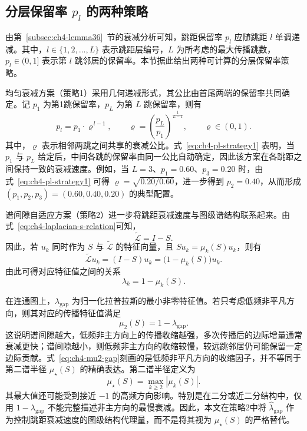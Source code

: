 \subsection{分层保留率 $p_l$ 的两种策略}
\label{subsec:ch4-plstrategy}
\label{idx:innov:hopdist}

由第~\ref{subsec:ch4-lemma36}~节的衰减分析可知，跳距保留率 \(p_l\) 应随跳距 \(l\) 单调递减。其中，\(l\in\{1,2,\dots,L\}\) 表示跳距层编号，\(L\) 为所考虑的最大传播跳数，\(p_l\in(0,1]\) 表示第 \(l\) 跳邻居的保留率。本节据此给出两种可计算的分层保留率策略。

均匀衰减方案（策略1）采用几何递减形式，其公比由首尾两端的保留率共同确定。记 \(p_1\) 为第1跳保留率，\(p_L\) 为第 \(L\) 跳保留率，则有
\begin{equation}
  p_l = p_1 \cdot \varrho^{\,l-1},
  \qquad
  \varrho=\left(\frac{p_L}{p_1}\right)^{\frac{1}{L-1}},
  \qquad \varrho\in(0,1).
  \label{eq:ch4-pl-strategy1}
\end{equation}
其中，\(\varrho\) 表示相邻两跳之间共享的衰减公比。式~\eqref{eq:ch4-pl-strategy1} 表明，当 \(p_1\) 与 \(p_L\) 给定后，中间各跳的保留率由同一公比自动确定，因此该方案在各跳距之间保持一致的衰减速度。例如，当 \(L=3\)、\(p_1=0.60\)、\(p_3=0.20\) 时，由式~\eqref{eq:ch4-pl-strategy1} 可得 \(\varrho=\sqrt{0.20/0.60}\)，进一步得到 \(p_2=0.40\)，从而形成 \((p_1,p_2,p_3)=(0.60,0.40,0.20)\) 的典型配置。

谱间隙自适应方案（策略2）进一步将跳距衰减速度与图级谱结构联系起来。由式~\eqref{eq:ch4-laplacian-s-relation}可知，
\begin{equation}
  \tilde{\mathcal{L}} = I-S.
  \label{eq:ch4-lap-s-for-gap}
\end{equation}
因此，若 \(u_k\) 同时作为 \(S\) 与 \(\tilde{\mathcal{L}}\) 的特征向量，且
\(S u_k=\mu_k(S)u_k\)，则有
\begin{equation}
  \tilde{\mathcal{L}}u_k
  =
  (I-S)u_k
  =
  \bigl(1-\mu_k(S)\bigr)u_k.
  \label{eq:ch4-lambda-mu-derive}
\end{equation}
由此可得对应特征值之间的关系
\begin{equation}
  \lambda_k = 1-\mu_k(S).
  \label{eq:ch4-lambda-mu-relation}
\end{equation}

在连通图上，\(\lambda_{\mathrm{gap}}\) 为归一化拉普拉斯的最小非零特征值。若只考虑低频非平凡方向，则其对应的传播特征值满足
\begin{equation}
  \mu_2(S)=1-\lambda_{\mathrm{gap}}.
  \label{eq:ch4-mu2-gap}
\end{equation}
这说明谱间隙越大，低频非主方向上的传播收缩越强，多次传播后的边际增量通常衰减更快；谱间隙越小，则低频非主方向的收缩较慢，较远跳邻居仍可能保留一定边际贡献。式~\eqref{eq:ch4-mu2-gap}刻画的是低频非平凡方向的收缩因子，并不等同于第二谱半径 \(\mu_\star(S)\) 的精确表达。第二谱半径定义为
\begin{equation}
  \mu_\star(S)=\max_{k\ge 2}|\mu_k(S)|.
  \label{eq:ch4-mustar-repeat}
\end{equation}
其最大值还可能受到接近 \(-1\) 的高频方向影响。特别是在二分或近二分结构中，仅用 \(1-\lambda_{\mathrm{gap}}\) 不能完整描述非主方向的最慢衰减。因此，本文在策略2中将 \(\hat{\lambda}_{\mathrm{gap}}\) 作为控制跳距衰减速度的图级结构代理量，而不是将其视为 \(\mu_\star(S)\) 的严格替代。


